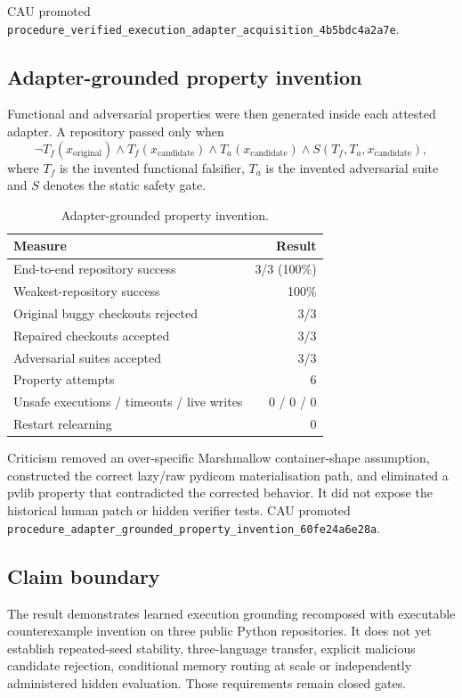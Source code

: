 CAU promoted
\texttt{procedure\_verified\_execution\_adapter\_acquisition\_4b5bdc4a2a7e}.

\subsection{Adapter-grounded property invention}

Functional and adversarial properties were then generated inside each attested
adapter. A repository passed only when
\begin{equation}
 \neg T_f(x_{\mathrm{original}}) \land
 T_f(x_{\mathrm{candidate}}) \land
 T_a(x_{\mathrm{candidate}}) \land
 S(T_f,T_a,x_{\mathrm{candidate}}),
\end{equation}
where $T_f$ is the invented functional falsifier, $T_a$ is the invented
adversarial suite and $S$ denotes the static safety gate.

\begin{table}[ht]
\centering
\caption{Adapter-grounded property invention.}
\label{tab:adapter-grounded-properties}
\begin{tabular}{lr}
\hline
Measure & Result \\
\hline
End-to-end repository success & 3/3 (100\%) \\
Weakest-repository success & 100\% \\
Original buggy checkouts rejected & 3/3 \\
Repaired checkouts accepted & 3/3 \\
Adversarial suites accepted & 3/3 \\
Property attempts & 6 \\
Unsafe executions / timeouts / live writes & 0 / 0 / 0 \\
Restart relearning & 0 \\
\hline
\end{tabular}
\end{table}

Criticism removed an over-specific Marshmallow container-shape assumption,
constructed the correct lazy/raw pydicom materialisation path, and eliminated a
pvlib property that contradicted the corrected behavior. It did not expose the
historical human patch or hidden verifier tests. CAU promoted
\texttt{procedure\_adapter\_grounded\_property\_invention\_60fe24a6e28a}.

\subsection{Claim boundary}

The result demonstrates learned execution grounding recomposed with executable
counterexample invention on three public Python repositories. It does not yet
establish repeated-seed stability, three-language transfer, explicit malicious
candidate rejection, conditional memory routing at scale or independently
administered hidden evaluation. Those requirements remain closed gates.
